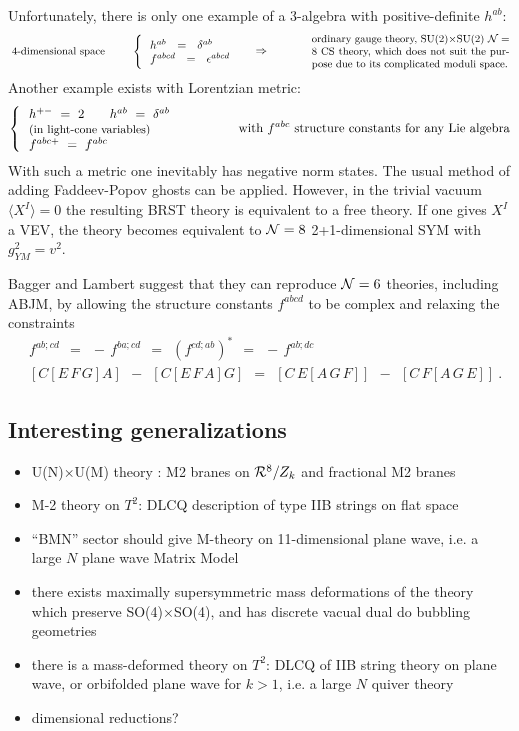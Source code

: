 \documentclass[12pt]{article}
\begin{document}
Unfortunately, there is only one example of a 3-algebra with positive-definite $ h^{ab} $:
\[
\parbox{3.0cm}{\centering\small 4-dimensional space}
\qquad
\left\{~~
\parbox{2.5cm}{$ h^{ab} ~~=~~ \delta^{ab} $ \\$ f^{abcd} ~~=~~ \epsilon^{abcd} $ }
\qquad
\parbox{1.0cm}{$ \Rightarrow$}
\qquad
\parbox{6.0cm}{\small ordinary gauge theory, SU(2)$\times$SU(2) $ \mc{N}=8 $ CS theory,
				which does not suit the purpose due to its complicated moduli space.}
\right.
\]
Another example exists with Lorentzian metric: 
\[
\left\{~~
\parbox{5.0cm}{
$ h^{+-} ~=~ 2 \qquad h^{ab} ~=~ \delta^{ab} $  \\
{\small (in light-cone variables)} \\
$ f^{abc+} ~=~ f^{abc} $
}
\right.
  \qquad\text{with $ f^{abc} $ structure constants for any Lie algebra}
\]
With such a metric one inevitably has negative norm states.
The usual method of adding Faddeev-Popov ghosts can be applied.
However, in the trivial vacuum $ \langle X^I \rangle = 0 $ the resulting BRST theory is equivalent to a
free theory.
If one gives $ X^I $ a VEV, the theory becomes equivalent to $ \mathcal{N}=8 $ 2+1-dimensional SYM 
with $ g_{YM}^2 = v^2 $.

Bagger and Lambert \cite{BL} suggest that they can reproduce $ \mathcal{N}=6 $ theories, including ABJM,
by allowing the structure constants $ f^{abcd} $ to be complex and relaxing the constraints
\begin{align*}
&	f^{ab;cd} ~~=~~ -\, f^{ba;cd} ~~=~~ (f^{cd;ab})^* ~~=~~ -\,f^{ab;dc} \\
&	\left[ C \left [ E \, F \, G \right] A \right] ~~-~~
	\left[ C \left[ E \, F \, A \right] G \right] ~~=~~
	\left[ C \, E \left[ A\,G\,F \right]\right] ~~-~~ \left[ C\,F \left[ A\, G \, E \right] \right]~.
\end{align*}

\subsection{Interesting generalizations}
\begin{itemize}
\item U(N)$\times$U(M) theory \cite{Aharony:2008gk}: M2 branes on $ \mathcal{R}^8/Z_k $ and fractional M2 branes
\item
	M-2 theory on $ T^2 $: DLCQ description of type IIB strings on flat space
\item
	``BMN'' sector should give M-theory on 11-dimensional plane wave, i.e. a large $N$ plane wave Matrix Model
\item
	there exists maximally supersymmetric mass deformations of the theory which preserve SO(4)$\times$SO(4),
	and has discrete vacual dual do bubbling geometries
\item
	there is a mass-deformed theory on $ T^2 $: DLCQ of IIB string theory on plane wave, or orbifolded plane
	wave for $ k> 1$, i.e. a large $ N $ quiver theory
\item
	dimensional reductions?
\end{itemize}
\end{document}
